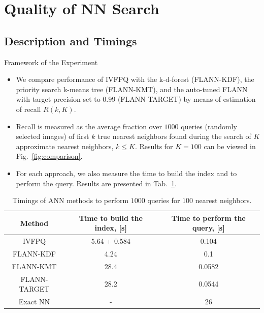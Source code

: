 \section{Quality of NN Search}
\subsection{Description and Timings}

\begin{frame}
	\begin{block}{Framework of the Experiment}
	\begin{itemize}
		\item We compare performance of IVFPQ with the k-d-forest (FLANN-KDF), the priority search k-means tree (FLANN-KMT), and the auto-tuned FLANN with target precision set to $0.99$ (FLANN-TARGET) by means of estimation of recall $R(k, K)$.\footnotemark
		\item Recall is measured as the average fraction over $1000$ queries (randomly selected images) of first $k$ true nearest neighbors found during the search of $K$ approximate nearest neighbors, $k \leq K$. Results for $K = 100$ can be viewed in Fig.~\ref{fig:comparison}.
		\item For each approach, we also measure the time to build the index and to perform the query. Results are presented in Tab.~\ref{tab:timings}.
	\end{itemize}

	\end{block}

\footnotesize{
\begin{table}
\centering
	\begin{tabular}{||c | c c ||} 
		\hline
		Method & Time to build the index, [s] & Time to perform the query, [s] \\ [0.5ex] 
		\hline\hline
		IVFPQ\footnotemark & 5.64 + 0.584 & 0.104  \\ 
		\hline
		FLANN-KDF & 4.24 & 0.1  \\
		\hline
		FLANN-KMT & 28.4 & 0.0582  \\
		\hline
		FLANN-TARGET & 28.2 & 0.0544  \\
		\hline
		Exact NN & - & 26  \\
		\hline
	\end{tabular}
	\caption{Timings of ANN methods to perform $1000$ queries for $100$ nearest neighbors.}
	\label{tab:timings}
\end{table}
}

\addtocounter{footnote}{-2}
\end{frame}


